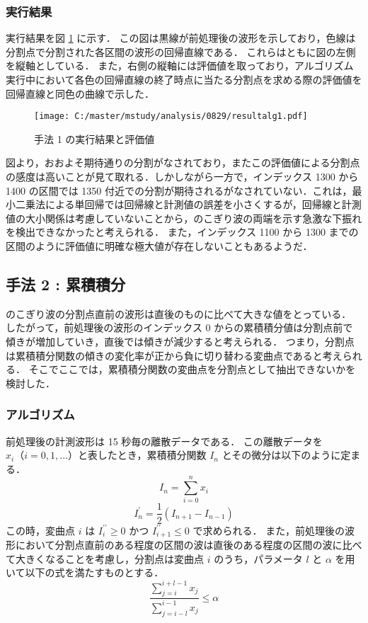 \documentclass[a4j]{jarticle}
\begin{document}
\subsubsection{実行結果}
実行結果を図 \ref{resultalg1} に示す．
この図は黒線が前処理後の波形を示しており，色線は分割点で分割された各区間の波形の回帰直線である．
これらはともに図の左側を縦軸としている．
また，右側の縦軸には評価値を取っており，アルゴリズム実行中において各色の回帰直線の終了時点に当たる分割点を求める際の評価値を回帰直線と同色の曲線で示した．
\begin{figure}[tb]
\begin{center}
\texttt{[image: C:/master/mstudy/analysis/0829/resultalg1.pdf]}
\caption{手法 1 の実行結果と評価値}
\label{resultalg1}
\end{center}
\end{figure}

図より，おおよそ期待通りの分割がなされており，またこの評価値による分割点の感度は高いことが見て取れる．しかしながら一方で，インデックス 1300 から 1400 の区間では 1350 付近での分割が期待されるがなされていない．これは，最小二乗法による単回帰では回帰線と計測値の誤差を小さくするが，回帰線と計測値の大小関係は考慮していないことから，のこぎり波の両端を示す急激な下振れを検出できなかったと考えられる．
また，インデックス 1100 から 1300 までの区間のように評価値に明確な極大値が存在しないこともあるようだ．

\subsection{手法 2 : 累積積分}
のこぎり波の分割点直前の波形は直後のものに比べて大きな値をとっている．
したがって，前処理後の波形のインデックス 0 からの累積積分値は分割点前で傾きが増加していき，直後では傾きが減少すると考えられる．
つまり，分割点は累積積分関数の傾きの変化率が正から負に切り替わる変曲点であると考えられる．
そこでここでは，累積積分関数の変曲点を分割点として抽出できないかを検討した．

\subsubsection{アルゴリズム}
前処理後の計測波形は 15 秒毎の離散データである．
この離散データを $x_i （i = 0,1,\ldots）$と表したとき，累積積分関数 $I_n$ とその微分は以下のように定まる．
$$I_n = \sum_{i=0}^n x_i$$
$$I_n^{\prime} = \frac{1}{2}(I_{n+1} - I_{n-1})$$
この時，変曲点 $i$ は $I_i^{\prime \prime} \geq 0$ かつ $I_{i+1}^{\prime \prime} \leq 0$ で求められる．
また，前処理後の波形において分割点直前のある程度の区間の波は直後のある程度の区間の波に比べて大きくなることを考慮し，分割点は変曲点 $i$ のうち，パラメータ $l$ と $\alpha$ を用いて以下の式を満たすものとする．
$$\frac{\sum_{j = i}^{i+l-1} x_j}{\sum_{j = i-l}^{i-1} x_j} \leq \alpha$$
\end{document}
